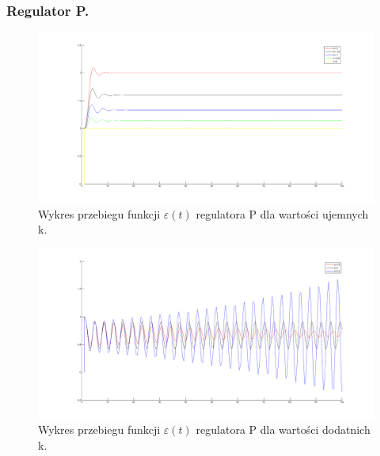 \documentclass[a4paper,10pt]{article}
\begin{document}
\subsubsection{Regulator P.}

\begin{figure}[!h]
    \centering
	\includegraphics[width=120mm]{CW2-regulatorP-eu.png}
	\caption{Wykres przebiegu funkcji $\varepsilon(t)$ regulatora P dla wartości ujemnych k.}
    \label{fig:regulatorPeu}
\end{figure}
\begin{figure}[!h]
    \centering
	\includegraphics[width=120mm]{CW2-regulatorP-ed.png}
	\caption{Wykres przebiegu funkcji $\varepsilon(t)$ regulatora P dla wartości dodatnich k.}
    \label{fig:regulatorPed}
\end{figure}
\end{document}
